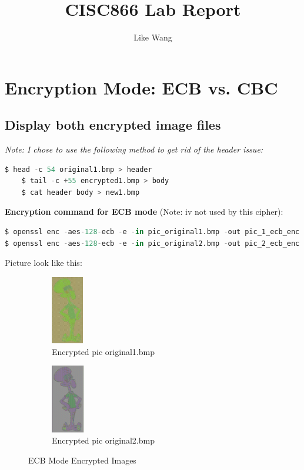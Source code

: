 \documentclass{article}
\title{CISC866 Lab Report}
\author{Like Wang}
\begin{document}
\maketitle

\section{Encryption Mode: ECB vs. CBC}

\subsection{Display both encrypted image files}

\textit{Note: I chose to use the following method to get rid of the header issue:}
\begin{lstlisting}[language=Python]
    $ head -c 54 original1.bmp > header
    $ tail -c +55 encrypted1.bmp > body
    $ cat header body > new1.bmp
\end{lstlisting}
\textbf{Encryption command for ECB mode} (Note: iv not used by this cipher):
\begin{lstlisting}[language=Python]
$ openssl enc -aes-128-ecb -e -in pic_original1.bmp -out pic_1_ecb_enc.bmp -K 00112233445566778889aabbccddeeff
$ openssl enc -aes-128-ecb -e -in pic_original2.bmp -out pic_2_ecb_enc.bmp -K 00112233445566778889aabbccddeeff
\end{lstlisting}
Picture look like this:
\begin{figure}[h]
    \centering
    \begin{subfigure}{0.45\textwidth}
        \centering
        \includegraphics[height=3cm]{images/pic_1_ecb.png}
        \caption{Encrypted pic original1.bmp}
    \end{subfigure}
    \begin{subfigure}{0.45\textwidth}
        \centering
        \includegraphics[height=3cm]{images/pic_2_ecb.png}
        \caption{Encrypted pic original2.bmp}
    \end{subfigure}
    \caption{ECB Mode Encrypted Images}
\end{figure}\\
\end{document}
